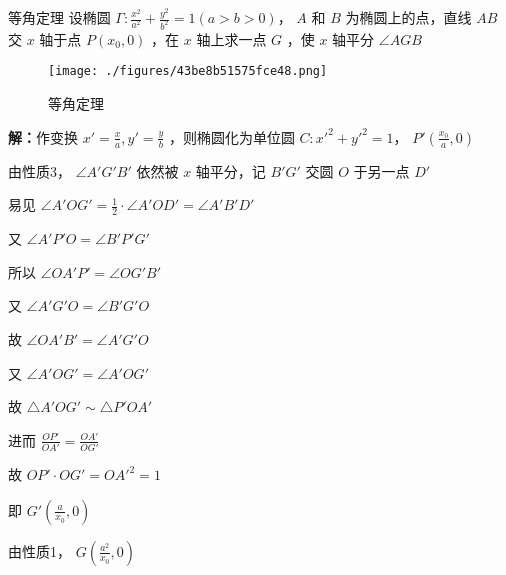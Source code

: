 \begin{corollary}{等角定理}
设椭圆 $\displaystyle{\Gamma:\frac{x^2}{a^2}+\frac{y^2}{b^2}=1(a>b>0)}$， $\displaystyle{A}$ 和 $\displaystyle{B}$ 为椭圆上的点，直线 $\displaystyle{AB}$ 交 $\displaystyle{x}$ 轴于点 $\displaystyle{P(x_0,0)}$ ，在 $\displaystyle{x}$ 轴上求一点 $\displaystyle{G}$ ，使 $\displaystyle{x}$ 轴平分 $\displaystyle{\angle AGB}$ 

\begin{figure}[ht]
\centering
\texttt{[image: ./figures/43be8b51575fce48.png]}
\caption{等角定理} \label{fig_affine_4}
\end{figure}
\textbf{解：}作变换 $\displaystyle{x'=\frac{x}{a},y'=\frac{y}{b}}$ ，则椭圆化为单位圆 $\displaystyle{C:x'^2+y'^2=1}$， $\displaystyle{P'\left(\frac{x_0}{a},0 \right)}$ 

由性质3， $\displaystyle{\angle A'G'B'}$ 依然被 $\displaystyle{x}$ 轴平分，记 $\displaystyle{B'G'}$ 交圆 $\displaystyle{O}$ 于另一点 $\displaystyle{D'}$

易见 $\displaystyle{\angle A'OG'=\frac{1}{2}\cdot\angle A'OD'=\angle A'B'D'}$ 

又 $\displaystyle{\angle A'P'O=\angle B'P'G'}$

所以 $\displaystyle{\angle OA'P'=\angle OG'B'}$

又 $\displaystyle{\angle A'G'O=\angle B'G'O}$

故 $\displaystyle{\angle OA'B'=\angle A'G'O}$

又 $\displaystyle{\angle A'OG'=\angle A'OG'}$

故 $\displaystyle{\triangle A'OG'\sim \triangle P'OA'}$

进而 $\displaystyle{\frac{OP'}{OA'}=\frac{OA'}{OG'}}$

故 $\displaystyle{OP'\cdot OG'=OA'^2=1}$ 

即 $\displaystyle{G'\left(\frac{a}{x_0},0\right)}$

由性质1， $\displaystyle{G\left( \frac{a^2}{x_0},0\right)}$ 

\end{corollary}

